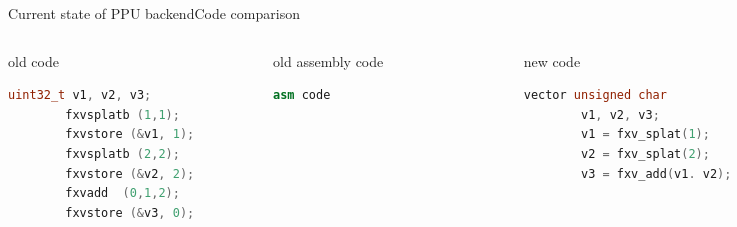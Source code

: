 \documentclass[10pt]{beamer}
\begin{document}
\begin{frame}[fragile]{Current state of PPU backend}{Code comparison}
\begin{columns}[t]
	\begin{column}{0.3\textwidth}
      \begin{block}{old code}
      \begin{lstlisting}[language=C++,basicstyle=\ttfamily\scriptsize,keywordstyle=\color{red}]
		uint32_t v1, v2, v3;
		fxvsplatb (1,1);
		fxvstore (&v1, 1);
		fxvsplatb (2,2);
		fxvstore (&v2, 2);
		fxvadd 	(0,1,2);
		fxvstore (&v3, 0);
		\end{lstlisting}
      \end{block}
    \end{column}    
    \begin{column}{0.3\textwidth}
      \begin{block}{old assembly code}
        \begin{lstlisting}[language=C++,basicstyle=\ttfamily\scriptsize,keywordstyle=\color{red}]
		asm code				
	\end{lstlisting}
      \end{block}
    \end{column}
    \begin{column}{0.3\textwidth}
      \begin{block}{new code}
        \begin{lstlisting}[language=C++,basicstyle=\ttfamily\scriptsize,keywordstyle=\color{red}]
		vector unsigned char
		v1, v2, v3;
		v1 = fxv_splat(1);
		v2 = fxv_splat(2);	
		v3 = fxv_add(v1. v2);			
	\end{lstlisting}
      \end{block}
    \end{column}
\end{columns}
\end{frame}
\end{document}
